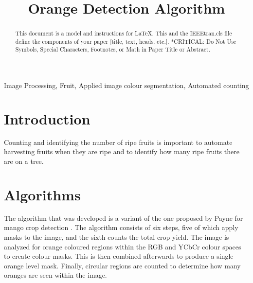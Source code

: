 \documentclass[conference]{IEEEtran}
\begin{document}
\title{Orange Detection Algorithm}

\author{
\and
{}
}

\maketitle

\begin{abstract}
This document is a model and instructions for \LaTeX.
This and the IEEEtran.cls file define the components of your paper [title, text, heads, etc.]. *CRITICAL: Do Not Use Symbols, Special Characters, Footnotes, 
or Math in Paper Title or Abstract.
\end{abstract}

\begin{IEEEkeywords}
Image Processing, Fruit, Applied image colour segmentation, Automated counting
\end{IEEEkeywords}

\section{Introduction}

Counting and identifying the number of ripe fruits is important to automate harvesting fruits when they are ripe and to identify how many ripe fruits there are on a tree.

\section{Algorithms}

The algorithm that was developed is a variant of the one proposed by Payne for mango crop detection  \cite{payne_estimation_2013}. The algorithm consists of six steps, five of which apply masks to the image, and the sixth counts the total crop yield. The image is analyzed for orange coloured regions within the RGB and YCbCr colour spaces to create colour masks. This is then combined afterwards to produce a single orange level mask. Finally, circular regions are counted to determine how many oranges are seen within the image.
\end{document}
